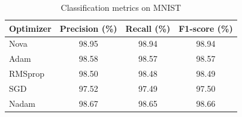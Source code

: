 \documentclass{article}
\begin{document}
\begin{table}[H]
\centering
\caption{Classification metrics on MNIST}
\begin{tabular}{lccc}
\toprule
Optimizer & Precision (\%) & Recall (\%) & F1-score (\%) \\
\midrule
Nova & 98.95 & 98.94 & 98.94 \\
Adam & 98.58 & 98.57 & 98.57 \\
RMSprop & 98.50 & 98.48 & 98.49 \\
SGD & 97.52 & 97.49 & 97.50 \\
Nadam & 98.67 & 98.65 & 98.66 \\
\bottomrule
\end{tabular}
\label{tab:mnist_prf}
\end{table}




\end{document}
